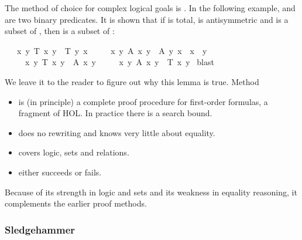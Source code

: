 \begin{isabellebody}
\begin{isamarkuptext}
The method of choice for complex logical goals is . In the
following example,  and  are two binary predicates. It
is shown that if  is total,  is antisymmetric and  is
a subset of , then  is a subset of :%
\end{isamarkuptext}%
\isamarkuptrue%
\isamarkupfalse%
\isanewline
\ \ {}{}\ {}x\ y{}\ T\ x\ y\ {}\ T\ y\ x{}\isanewline
\ \ \ \ \ {}x\ y{}\ A\ x\ y\ {}\ A\ y\ x\ {}\ x\ {}\ y{}\isanewline
\ \ \ \ \ {}x\ y{}\ T\ x\ y\ {}\ A\ x\ y\ {}\isanewline
\ \ \ {}\ {}x\ y{}\ A\ x\ y\ {}\ T\ x\ y{}\isanewline
%
\isadelimproof
%
\endisadelimproof
%
\isatagproof
{}\isamarkupfalse%
\ blast%
\endisatagproof
{\isafoldproof}%
%
\isadelimproof
%
\endisadelimproof
%
\begin{isamarkuptext}%
We leave it to the reader to figure out why this lemma is true.
Method 
\begin{itemize}
\item is (in principle) a complete proof procedure for first-order formulas,
  a fragment of HOL. In practice there is a search bound.
\item does no rewriting and knows very little about equality.
\item covers logic, sets and relations.
\item either succeeds or fails.
\end{itemize}
Because of its strength in logic and sets and its weakness in equality reasoning, it complements the earlier proof methods.


\subsubsection{Sledgehammer}


\end{isamarkuptext}
\end{isabellebody}
